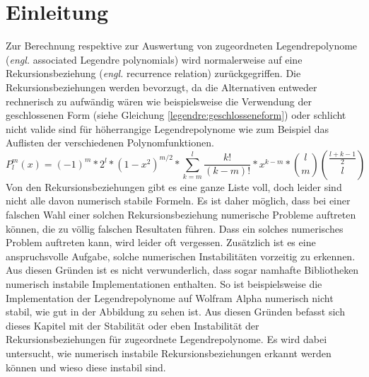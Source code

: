 %
%
%
\section{Einleitung\label{legendre:section:einleitung}}
Zur Berechnung respektive zur Auswertung von zugeordneten Legendrepolynome (\textit{engl.} associated Legendre polynomials) wird normalerweise auf eine Rekursionsbeziehung (\textit{engl.} recurrence relation) zurückgegriffen.
Die Rekursionsbeziehungen werden bevorzugt, da die Alternativen entweder rechnerisch zu aufwändig wären wie beispielsweise die Verwendung der geschlossenen Form (siehe Gleichung \eqref{legendre:geschlosseneform}) oder schlicht nicht valide sind für höherrangige Legendrepolynome wie zum Beispiel das Auflisten der verschiedenen Polynomfunktionen.
\begin{equation}
P^{m}_{l}(x)
=
(-1)^m*2^l*(1-x^2)^{m/2}
* \sum_{k=m}^{l} \frac{k!}{(k-m)!}*x^{k-m}
* \binom{l}{m} \binom{\frac{l+k-1}{2}}{l}
\label{legendre:geschlosseneform}
\end{equation}
Von den Rekursionsbeziehungen gibt es eine ganze Liste voll, doch leider sind nicht alle davon numerisch stabile Formeln.
Es ist daher möglich, dass bei einer falschen Wahl einer solchen Rekursionsbeziehung numerische Probleme auftreten können, die zu völlig falschen Resultaten führen.
Dass ein solches numerisches Problem auftreten kann, wird leider oft vergessen.
Zusätzlich ist es eine anspruchsvolle Aufgabe, solche numerischen Instabilitäten vorzeitig zu erkennen.
Aus diesen Gründen ist es nicht verwunderlich, dass sogar namhafte Bibliotheken numerisch instabile Implementationen enthalten.
So ist beispielsweise die Implementation der Legendrepolynome auf Wolfram Alpha \cite{legendre:wolfram-alpha} numerisch nicht stabil, wie gut in der Abbildung  zu sehen ist.
Aus diesen Gründen befasst sich dieses Kapitel mit der Stabilität oder eben Instabilität der Rekursionsbeziehungen für zugeordnete Legendrepolynome.
Es wird dabei untersucht, wie numerisch instabile Rekursionsbeziehungen erkannt werden können und wieso diese instabil sind.







